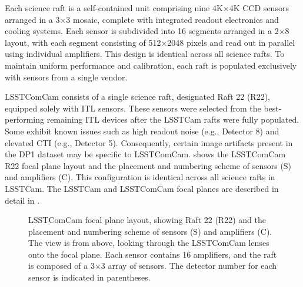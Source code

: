 Each science raft is a self-contained unit comprising nine 4K$\times$4K \gls{CCD} \citep{2010RvMP...82.2307S} sensors arranged in a 3$\times$3 mosaic, complete with integrated readout electronics and cooling systems.
Each sensor is subdivided into 16 segments arranged in a 2$\times$8 layout, with each segment consisting of 512$\times$2048 pixels and read out in parallel using individual amplifiers.
This design is identical across all science rafts.
To maintain uniform performance and \gls{calibration}, each raft is populated exclusively with sensors from a single vendor.

\gls{LSSTComCam} consists of a single science raft, designated Raft 22 (R22), equipped solely with \gls{ITL} sensors.
These sensors were selected from the best-performing  remaining \gls{ITL} devices after the \gls{LSSTCam} rafts were fully populated.
Some exhibit known issues such as high readout noise (e.g., Detector 8) and elevated \gls{CTI} (e.g., Detector 5).
Consequently, certain image artifacts present in the \gls{DP1} dataset may be specific to \gls{LSSTComCam}.
 shows the \gls{LSSTComCam} R22 focal plane layout  and the placement and numbering scheme of sensors (S) and amplifiers (C).
This configuration is identical across all science rafts in \gls{LSSTCam}.
The \gls{LSSTCam} and \gls{LSSTComCam} focal planes are described in detail in \cite{CTN-001}.
\begin{figure}[htb!]
\caption{\gls{LSSTComCam} focal plane layout, showing Raft 22 (R22) and the placement and numbering scheme of sensors (S) and amplifiers (C). The view is from above, looking through the \gls{LSSTComCam} lenses onto the focal plane. Each sensor contains 16 amplifiers, and the raft is composed of a 3$\times$3 array of sensors. The detector number for each sensor is indicated in parentheses.}
\label{fig:raft_schematic}
\end{figure}

